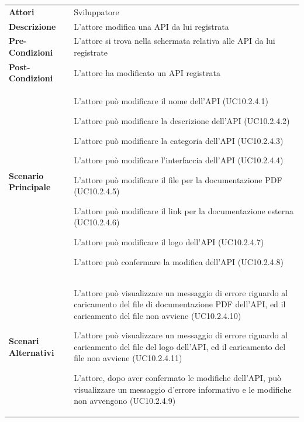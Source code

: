 \begin{minipage}{\linewidth}
	\begin{tabular}{ l | p{11cm}}
		\hline
		\rowcolor{Gray}
		\multicolumn{2}{c}{UC10.2.4 - Modifica API registrata} \\
		\hline
		\textbf{Attori} & Sviluppatore \\
		\textbf{Descrizione} & L'attore modifica una API da lui registrata \\
		\textbf{Pre-Condizioni} & L'attore si trova nella schermata relativa alle API da lui registrate \\
		\textbf{Post-Condizioni} & L'attore ha modificato un API registrata \\
		\textbf{Scenario Principale} & 
		\begin{enumerate*}[label=(\arabic*.),itemjoin={\newline}]
			\item L'attore può modificare il nome dell'API (UC10.2.4.1)
			\item L'attore può modificare la descrizione dell'API (UC10.2.4.2)
			\item L'attore può modificare la categoria dell'API (UC10.2.4.3)
			\item L'attore può modificare l'interfaccia dell'API (UC10.2.4.4)
			\item L'attore può modificare il file per la documentazione PDF (UC10.2.4.5)
			\item L'attore può modificare il link per la documentazione esterna (UC10.2.4.6)
			\item L'attore può modificare il logo dell'API (UC10.2.4.7)
			\item L'attore può confermare la modifica dell'API (UC10.2.4.8)
		\end{enumerate*}\\
		\textbf{Scenari Alternativi} & 
		\begin{enumerate*}[label=(\arabic*.),itemjoin={\newline}]
			\item L'attore può visualizzare un messaggio di errore riguardo al caricamento del file di documentazione PDF dell'API, ed il caricamento del file non avviene (UC10.2.4.10)
			\item L'attore può visualizzare un messaggio di errore riguardo al caricamento del file del logo dell'API, ed il caricamento del file non avviene (UC10.2.4.11)
			\item L'attore, dopo aver confermato le modifiche dell'API, può visualizzare un messaggio d'errore informativo e le modifiche non avvengono (UC10.2.4.9)
		\end{enumerate*}\\
	\end{tabular}
\end{minipage}

